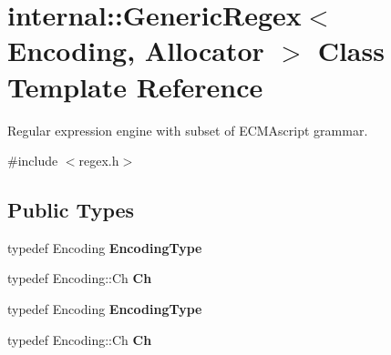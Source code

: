 \hypertarget{classinternal_1_1_generic_regex}{}\section{internal\+:\+:Generic\+Regex$<$ Encoding, Allocator $>$ Class Template Reference}
\label{classinternal_1_1_generic_regex}


Regular expression engine with subset of E\+C\+M\+Ascript grammar.  




{\ttfamily \#include $<$regex.\+h$>$}

\subsection*{Public Types}
\begin{DoxyCompactItemize}
\item 
typedef Encoding {\bfseries Encoding\+Type}\hypertarget{classinternal_1_1_generic_regex_a8d0eb2f6a71868b2a8f03382b7836d30}{}\label{classinternal_1_1_generic_regex_a8d0eb2f6a71868b2a8f03382b7836d30}

\item 
typedef Encoding\+::\+Ch {\bfseries Ch}\hypertarget{classinternal_1_1_generic_regex_a44e1a86ec27e1c5628a7d91c8c3daace}{}\label{classinternal_1_1_generic_regex_a44e1a86ec27e1c5628a7d91c8c3daace}

\item 
typedef Encoding {\bfseries Encoding\+Type}\hypertarget{classinternal_1_1_generic_regex_a8d0eb2f6a71868b2a8f03382b7836d30}{}\label{classinternal_1_1_generic_regex_a8d0eb2f6a71868b2a8f03382b7836d30}

\item 
typedef Encoding\+::\+Ch {\bfseries Ch}\hypertarget{classinternal_1_1_generic_regex_a44e1a86ec27e1c5628a7d91c8c3daace}{}\label{classinternal_1_1_generic_regex_a44e1a86ec27e1c5628a7d91c8c3daace}

\end{DoxyCompactItemize}
